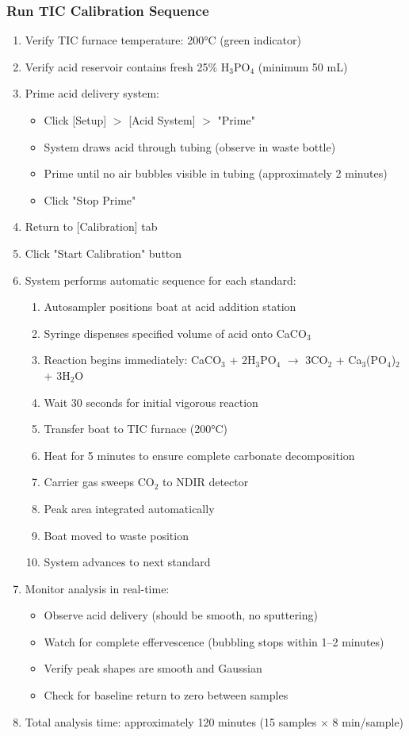 \documentclass[11pt,a4paper]{article}\usepackage[]{graphicx}\usepackage[]{xcolor}
\begin{document}
\subsubsection{Run TIC Calibration Sequence}
\begin{enumerate}[noitemsep]
    \item Verify TIC furnace temperature: 200°C (green indicator)
    \item Verify acid reservoir contains fresh 25\% H$_3$PO$_4$ (minimum 50 mL)
    \item Prime acid delivery system:
    \begin{itemize}
        \item Click [Setup] $>$ [Acid System] $>$ "Prime"
        \item System draws acid through tubing (observe in waste bottle)
        \item Prime until no air bubbles visible in tubing (approximately 2 minutes)
        \item Click "Stop Prime"
    \end{itemize}
    \item Return to [Calibration] tab
    \item Click "Start Calibration" button
    \item System performs automatic sequence for each standard:
    \begin{enumerate}
        \item Autosampler positions boat at acid addition station
        \item Syringe dispenses specified volume of acid onto CaCO$_3$
        \item Reaction begins immediately: CaCO$_3$ + 2H$_3$PO$_4$ $\rightarrow$ 3CO$_2$ + Ca$_3$(PO$_4$)$_2$ + 3H$_2$O
        \item Wait 30 seconds for initial vigorous reaction
        \item Transfer boat to TIC furnace (200°C)
        \item Heat for 5 minutes to ensure complete carbonate decomposition
        \item Carrier gas sweeps CO$_2$ to NDIR detector
        \item Peak area integrated automatically
        \item Boat moved to waste position
        \item System advances to next standard
    \end{enumerate}
    \item Monitor analysis in real-time:
    \begin{itemize}
        \item Observe acid delivery (should be smooth, no sputtering)
        \item Watch for complete effervescence (bubbling stops within 1--2 minutes)
        \item Verify peak shapes are smooth and Gaussian
        \item Check for baseline return to zero between samples
    \end{itemize}
    \item Total analysis time: approximately 120 minutes (15 samples $\times$ 8 min/sample)
\end{enumerate}
\end{document}
